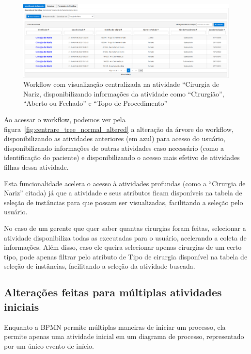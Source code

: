 \begin{figure}
    \centering
    \includegraphics[width=1\textwidth]{imgs/CENTRARE/instanciaAlterada.png}
    \caption{Workflow com visualização centralizada na atividade ``Cirurgia de Nariz, disponibilizando informações da atividade como ``Cirurgião'', ``Aberto ou Fechado'' e ``Topo de Procedimento''}
    \label{fig:changedInstance}
\end{figure}

Ao acessar o workflow, podemos ver pela figura~\ref{fig:centrare_tree_normal_altered} a alteração da árvore do workflow, disponibilizando as atividades anteriores (em azul) para acesso do usuário, disponibilizando informações de outras atividades caso necessário (como a identificação do paciente) e disponibilizando o acesso mais efetivo de atividades filhas dessa atividade.

Esta funcionalidade acelera o acesso à atividades profundas (como a ``Cirurgia de Nariz'' citada) já que a atividade e seus atributos ficam disponíveis na tabela de seleção de instâncias para que possam ser visualizadas, facilitando a seleção pelo usuário.

No caso de um gerente que quer saber quantas cirurgias foram feitas, selecionar a atividade disponibiliza todas as executadas para o usuário, acelerando a coleta de informações. Além disso, caso ele queira selecionar apenas cirurgias de um certo tipo, pode apenas filtrar pelo atributo de Tipo de cirurgia disponível na tabela de seleção de instâncias, facilitando a seleção da atividade buscada.

\subsection{Alterações feitas para múltiplas atividades iniciais}

Enquanto a BPMN permite múltiplas maneiras de iniciar um processo, ela permite apenas uma atividade inicial em um diagrama de processo, representado por um único evento de início.

